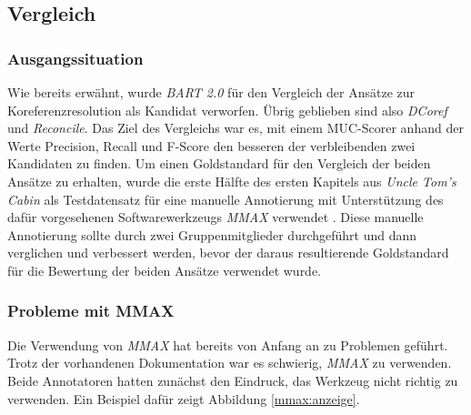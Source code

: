 \documentclass[a4paper,12pt,titlepage=true, ngerman]{scrartcl}
\begin{document}

\subsection{Vergleich}%



\subsubsection{Ausgangssituation}\label{Ausgangssituation}

Wie bereits erwähnt, wurde \emph{BART 2.0} für den Vergleich der Ansätze zur Koreferenzresolution als Kandidat verworfen. Übrig geblieben sind also \emph{DCoref} und \emph{Reconcile}. Das Ziel des Vergleichs war es, mit einem MUC-Scorer anhand der Werte Precision, Recall und F-Score den besseren der verbleibenden zwei Kandidaten zu finden. Um einen Goldstandard für den Vergleich der beiden Ansätze zu erhalten, wurde die erste Hälfte des ersten Kapitels aus \emph{Uncle Tom's Cabin} \autocite[]{chris_uncle} als Testdatensatz für eine manuelle Annotierung mit Unterstützung des dafür vorgesehenen Softwarewerkzeugs \emph{MMAX} \autocite*[]{chris_mmax} verwendet \autocite[]{chris_mmax_coll}. Diese manuelle Annotierung sollte durch zwei Gruppenmitglieder durchgeführt und dann verglichen und verbessert werden, bevor der daraus resultierende Goldstandard für die Bewertung der beiden Ansätze verwendet wurde.



\subsubsection{Probleme mit MMAX}%

Die Verwendung von \emph{MMAX} hat bereits von Anfang an zu Problemen geführt. Trotz der vorhandenen Dokumentation war es schwierig, \emph{MMAX} zu verwenden. Beide Annotatoren hatten zunächst den Eindruck, das Werkzeug nicht richtig zu verwenden. Ein Beispiel dafür zeigt Abbildung \ref{mmax:anzeige}.
\end{document}
